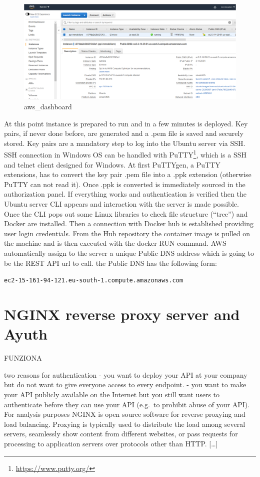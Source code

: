 \documentclass[
  12pt,
  a4paper,
  oneside]{book}
\DeclareRobustCommand{\href}[2]{#2\footnote{\url{#1}}}
\theoremstyle{definition}
\theoremstyle{definition}
\theoremstyle{definition}
\theoremstyle{remark}
\begin{document}
\begin{figure}
\centering
\includegraphics{images/aws.PNG}
\caption{aws\_dashboard}
\end{figure}

At this point instance is prepared to run and in a few minutes is deployed. Key pairs, if never done before, are generated and a .pem file is saved and securely stored. Key pairs are a mandatory step to log into the Ubuntu server via SSH. SSH connection in Windows OS can be handled with \href{https://www.putty.org/}{PuTTY}, which is a SSH and telnet client designed for Windows. At first PuTTYgen, a PuTTY extensions, has to convert the key pair .pem file into a .ppk extension (otherwise PuTTY can not read it). Once .ppk is converted is immediately sourced in the authorization panel. If everything works and authentication is verified then the Ubuntu server CLI appears and interaction with the server is made possible.
Once the CLI pops out some Linux libraries to check file structure (``tree'') and Docker are installed. Then a connection with Docker hub is established providing user login credentials. From the Hub repository the container image is pulled on the machine and is then executed with the docker RUN command.
AWS automatically assign to the server a unique Public DNS address which is going to be the REST API url to call.
the Public DNS has the following form:

\texttt{ec2-15-161-94-121.eu-south-1.compute.amazonaws.com}

\hypertarget{nginx}{%
\section{NGINX reverse proxy server and Ayuth}\label{nginx}}

FUNZIONA

two reasons for authentication
- you want to deploy your API at your company but do not want to give everyone access to every endpoint.
- you want to make your API publicly available on the Internet but you still want users to authenticate before they can use your API (e.g.~to prohibit abuse of your API).
For analysis purposes NGINX is open source software for reverse proxying and load balancing.
Proxying is typically used to distribute the load among several servers, seamlessly show content from different websites, or pass requests for processing to application servers over protocols other than HTTP.
{[}\ldots{]}
\end{document}
